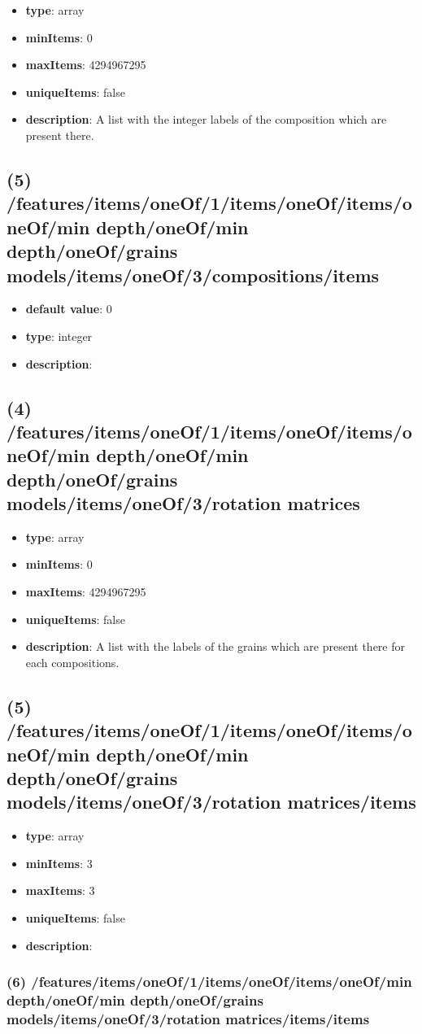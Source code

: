 \begin{itemize}[leftmargin=4em]\item {\bf type}: array
\item {\bf minItems}: 0
\item {\bf maxItems}: 4294967295
\item {\bf uniqueItems}: false
\item {\bf description}: A list with the integer labels of the composition which are present there.
\end{itemize}\subsection{(5) /features/items/oneOf/1/items/oneOf/items/oneOf/min depth/oneOf/min depth/oneOf/grains models/items/oneOf/3/compositions/items}
\begin{itemize}[leftmargin=5em]\item {\bf default value}: 0
\item {\bf type}: integer
\item {\bf description}: 
\end{itemize}\subsection{(4) /features/items/oneOf/1/items/oneOf/items/oneOf/min depth/oneOf/min depth/oneOf/grains models/items/oneOf/3/rotation matrices}
\begin{itemize}[leftmargin=4em]\item {\bf type}: array
\item {\bf minItems}: 0
\item {\bf maxItems}: 4294967295
\item {\bf uniqueItems}: false
\item {\bf description}: A list with the labels of the grains which are present there for each compositions.
\end{itemize}\subsection{(5) /features/items/oneOf/1/items/oneOf/items/oneOf/min depth/oneOf/min depth/oneOf/grains models/items/oneOf/3/rotation matrices/items}
\begin{itemize}[leftmargin=5em]\item {\bf type}: array
\item {\bf minItems}: 3
\item {\bf maxItems}: 3
\item {\bf uniqueItems}: false
\item {\bf description}: 
\end{itemize}\subsubsection{(6) /features/items/oneOf/1/items/oneOf/items/oneOf/min depth/oneOf/min depth/oneOf/grains models/items/oneOf/3/rotation matrices/items/items}
